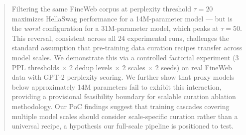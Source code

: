 \begin{abstract}
Filtering the same FineWeb corpus at perplexity threshold $\tau{=}20$ maximizes HellaSwag performance for a 14M-parameter model --- but is the \emph{worst} configuration for a 31M-parameter model, which peaks at $\tau{=}50$. This reversal, consistent across all 24 experimental runs, challenges the standard assumption that pre-training data curation recipes transfer across model scales. We demonstrate this via a controlled factorial experiment (3 PPL thresholds $\times$ 2 dedup levels $\times$ 2 scales $\times$ 2 seeds) on real FineWeb data with GPT-2 perplexity scoring. We further show that proxy models below approximately 14M parameters fail to exhibit this interaction, providing a provisional feasibility boundary for scalable curation ablation methodology. Our PoC findings suggest that training cascades covering multiple model scales should consider scale-specific curation rather than a universal recipe, a hypothesis our full-scale pipeline is positioned to test.
\end{abstract}
